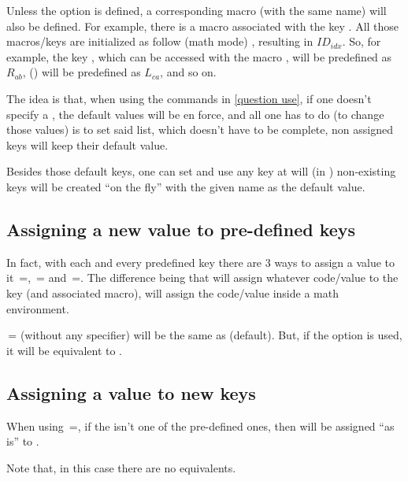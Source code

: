 \documentclass[10pt]{article}
\begin{document}
Unless the  option is defined, a corresponding macro (with the same name) will also be defined. For example, there is a macro \tsobj{\Ra} associated with the key .
All those macros/keys are initialized  as follow (math mode) , resulting in $ID_{idx}$. So, for example, the key , which can be accessed with the macro \tsobj{\Rab},  will be predefined as $R_{ab}$,  (\tsobj{\Lca}) will be predefined as $L_{ca}$, and so on.

The idea is that, when using the commands in \ref{question use}, if one doesn't specify a , the default values will be en force, and all one has to do (to change those values) is to set said list, which doesn't have to be complete, non assigned keys will keep their default value.

Besides those default keys, one can set and use any key at will (in ) non-existing keys will be created ``on the fly'' with the given name as the default value.

\subsection{Assigning a new value to pre-defined keys}
In fact, with each and every predefined key there are 3 ways to assign a value to it \,=, \,= and \,=. The difference being that  will assign whatever code/value to the key (and associated macro),  will assign the code/value inside a math environment. 
\begin{tsremark}
\,= (without any specifier) will be the same as  (default). But, if the option  is used, it will be equivalent to .
\end{tsremark}

\subsection{Assigning a value to new keys}
When using  \,=, if the  isn't one of the pre-defined ones, then  will be assigned ``as is'' to .
\begin{tsremark}
Note that, in this case there are no  equivalents. 
\end{tsremark}
\end{document}
